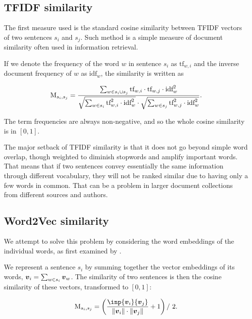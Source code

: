 \subsection{TFIDF similarity}

The first measure used is the standard cosine similarity between TFIDF vectors \citep{information-retrieval} of two sentences $s_{i}$ and $s_{j}$. Such method is a simple measure of document similarity often used in information retrieval.

If we denote the frequency of the word $w$ in sentence $s_{i}$ as $\text{tf}_{w,i}$ and the inverse document frequency of $w$ as $\text{idf}_{w}$, the similarity is written as

\begin{equation}
	\text{M}_{s_{i}, s_{j}} = \frac{\sum_{w \in s_{i} \cup s_{j}} \text{tf}_{w,i} \cdot \text{tf}_{w,j} \cdot \text{idf}_{w}^{2}}{\sqrt{\sum_{w \in s_{i}} \text{tf}_{w, i}^{2} \cdot \text{idf}_{w}^{2}} \cdot \sqrt{\sum_{w \in s_{j}} \text{tf}_{w, j}^{2} \cdot \text{idf}_{w}^{2}}}.
\end{equation}

The term frequencies are always non-negative, and so the whole cosine similarity is in $[0, 1]$.

The major setback of TFIDF similarity is that it does not go beyond simple word overlap, though weighted to diminish stopwords and amplify important words. That means that if two sentences convey essentially the same information through different vocabulary, they will not be ranked similar due to having only a few words in common. That can be a problem in larger document collections from different sources and authors.

\subsection{Word2Vec similarity}

We attempt to solve this problem by considering the word embeddings of the individual words, as first examined by \cite{mogren-1}.

We represent a sentence $s_{i}$ by summing together the vector embeddings of its words, $\embed_{i} = \sum_{w \in s_{i}} \embed_{w}$. The similarity of two sentences is then the cosine similarity of these vectors, transformed to $[0, 1]$:

\begin{equation}
	\similarity_{s_{i}, s_{j}} = \left(\frac{\inp{\embed_{i}}{\embed_{j}}}{\| \embed_{i} \| \cdot \| \embed_{j} \|} + 1 \right) / \ 2.
\end{equation}


